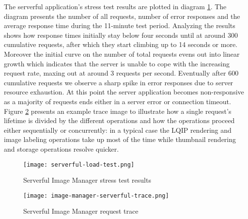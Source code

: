 The serverful application's stress test results are plotted in diagram \ref{fig:serverfulStressTest}. The diagram presents the number of all requests, number of error responses and the average response time during the 11-minute test period. Analyzing the results shows how response times initially stay below four seconds until at around 300 cumulative requests, after which they start climbing up to 14 seconds or more. Moreover the initial curve on the number of total requests evens out into linear growth which indicates that the server is unable to cope with the increasing request rate, maxing out at around 3 requests per second. Eventually after 600 cumulative requests we observe a sharp spike in error responses due to server resource exhaustion. At this point the server application becomes non-responsive as a majority of requests ends either in a server error or connection timeout. Figure \ref{fig:serverfulTrace} presents an example trace image to illustrate how a single request's lifetime is divided by the different operations and how the operations proceed either sequentially or concurrently: in a typical case the LQIP rendering and image labeling operations take up most of the time while thumbnail rendering and storage operations resolve quicker.

\begin{figure}[h]
  \centering
  \texttt{[image: serverful-load-test.png]}
  \caption{Serverful Image Manager stress test results}
  \label{fig:serverfulStressTest}
\end{figure}

\begin{figure}[h]
  \centering
  \texttt{[image: image-manager-serverful-trace.png]}
  \caption{Serverful Image Manager request trace}
  \label{fig:serverfulTrace}
\end{figure}

